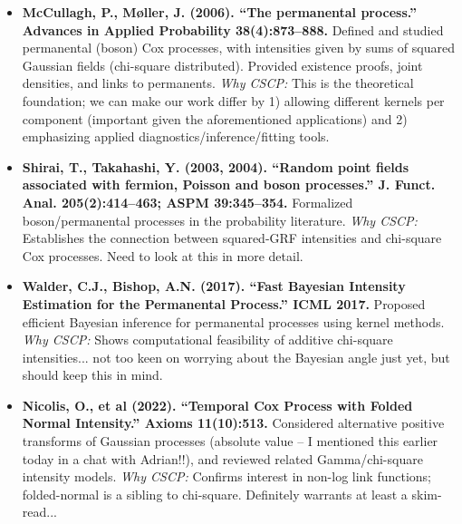 \documentclass[11pt]{article}
\begin{document}
	\begin{itemize}
		\item \textbf{McCullagh, P., Møller, J. (2006). ``The permanental process.'' Advances in Applied Probability 38(4):873--888.}  
		Defined and studied permanental (boson) Cox processes, with intensities given by sums of squared Gaussian fields (chi-square distributed). Provided existence proofs, joint densities, and links to permanents.  
		\emph{Why CSCP:} This is the theoretical foundation; we can make our work differ by 1) allowing different kernels per component (important given the aforementioned applications) and 2) emphasizing applied diagnostics/inference/fitting tools.
		
		\item \textbf{Shirai, T., Takahashi, Y. (2003, 2004). ``Random point fields associated with fermion, Poisson and boson processes.'' J. Funct. Anal. 205(2):414--463; ASPM 39:345--354.}  
		Formalized boson/permanental processes in the probability literature.  
		\emph{Why CSCP:} Establishes the connection between squared-GRF intensities and chi-square Cox processes. Need to look at this in more detail.
		
		\item \textbf{Walder, C.J., Bishop, A.N. (2017). ``Fast Bayesian Intensity Estimation for the Permanental Process.'' ICML 2017.}  
		Proposed efficient Bayesian inference for permanental processes using kernel methods.  
		\emph{Why CSCP:} Shows computational feasibility of additive chi-square intensities... not too keen on worrying about the Bayesian angle just yet, but should keep this in mind.
		
		\item \textbf{Nicolis, O., et al (2022). ``Temporal Cox Process with Folded Normal Intensity.'' Axioms 11(10):513.}  
		Considered alternative positive transforms of Gaussian processes (absolute value -- I mentioned this earlier today in a chat with Adrian!!), and reviewed related Gamma/chi-square intensity models.  
		\emph{Why CSCP:} Confirms interest in non-log link functions; folded-normal is a sibling to chi-square. Definitely warrants at least a skim-read...
	\end{itemize}
	
\end{document}
